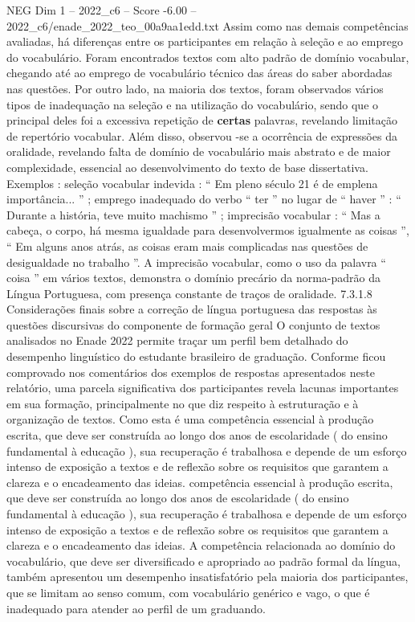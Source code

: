 \begin{textsample}{NEG Dim 1 – 2022\_c6 – Score -6.00 – 2022\_c6/enade\_2022\_teo\_00a9aa1edd.txt}
Assim como nas demais competências avaliadas, há diferenças entre os participantes em relação à seleção e ao emprego do vocabulário.
Foram encontrados textos com alto padrão de domínio vocabular, chegando até ao emprego de vocabulário técnico das áreas do saber abordadas nas questões.
Por outro lado, na maioria dos textos, foram observados vários tipos de inadequação na seleção e na utilização do vocabulário, sendo que o principal deles foi a excessiva repetição de \textbf{certas} palavras, revelando limitação de repertório vocabular.
Além disso, observou -se a ocorrência de expressões da oralidade, revelando falta de domínio de vocabulário mais abstrato e de maior complexidade, essencial ao desenvolvimento do texto de base dissertativa.
Exemplos : seleção vocabular indevida : “ Em pleno século 21 é de emplena importância... ” ; emprego inadequado do verbo “ ter ” no lugar de “ haver ” : “ Durante a história, teve muito machismo ” ; imprecisão vocabular : “ Mas a cabeça, o corpo, há mesma igualdade para desenvolvermos igualmente as coisas ”, “ Em alguns anos atrás, as coisas eram mais complicadas nas questões de desigualdade no trabalho ”.
A imprecisão vocabular, como o uso da palavra “ coisa ” em vários textos, demonstra o domínio precário da norma-padrão da Língua Portuguesa, com presença constante de traços de oralidade. 7.3.1.8 Considerações finais sobre a correção de língua portuguesa das respostas às questões discursivas do componente de formação geral O conjunto de textos analisados no Enade 2022 permite traçar um perfil bem detalhado do desempenho linguístico do estudante brasileiro de graduação.
Conforme ficou comprovado nos comentários dos exemplos de respostas apresentados neste relatório, uma parcela significativa dos participantes revela lacunas importantes em sua formação, principalmente no que diz respeito à estruturação e à organização de textos.
Como esta é uma competência essencial à produção escrita, que deve ser construída ao longo dos anos de escolaridade ( do ensino fundamental à educação ), sua recuperação é trabalhosa e depende de um esforço intenso de exposição a textos e de reflexão sobre os requisitos que garantem a clareza e o encadeamento das ideias. competência essencial à produção escrita, que deve ser construída ao longo dos anos de escolaridade ( do ensino fundamental à educação ), sua recuperação é trabalhosa e depende de um esforço intenso de exposição a textos e de reflexão sobre os requisitos que garantem a clareza e o encadeamento das ideias.
A competência relacionada ao domínio do vocabulário, que deve ser diversificado e apropriado ao padrão formal da língua, também apresentou um desempenho insatisfatório pela maioria dos participantes, que se limitam ao senso comum, com vocabulário genérico e vago, o que é inadequado para atender ao perfil de um graduando.

\end{textsample}
